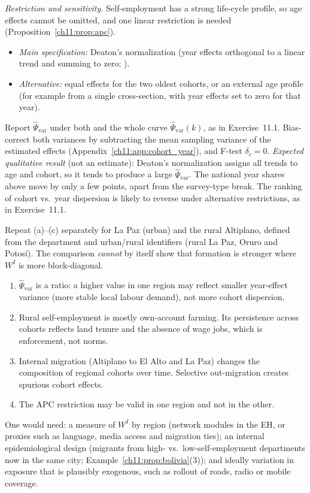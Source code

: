 \documentclass[../solutions_manual.tex]{subfiles}
\begin{document}
 \emph{Restriction and sensitivity.} Self-employment has a strong life-cycle profile, so age effects cannot be omitted, and one linear restriction is needed (Proposition~\ref{ch11:prop:apc}).
\begin{itemize}
\item \emph{Main specification:} Deaton's normalization (year effects orthogonal to a linear trend and summing to zero; \citealt[\S2.7]{deaton1997analysis}).
\item \emph{Alternative:} equal effects for the two oldest cohorts, or an external age profile (for example from a single cross-section, with year effects set to zero for that year).
\end{itemize}
Report $\hat\Psi_{\text{var}}$ under both and the whole curve $\hat\Psi_{\text{var}}(k)$, as in Exercise~11.1. Bias-correct both variances by subtracting the mean sampling variance of the estimated effects (Appendix~\ref{ch11:app:cohort_year}), and F-test $\delta_c = 0$. \emph{Expected qualitative result} (not an estimate): Deaton's normalization assigns all trends to age and cohort, so it tends to produce a large $\hat\Psi_{\text{var}}$. The national year shares above move by only a few points, apart from the survey-type break. The ranking of cohort vs.\ year dispersion is likely to reverse under alternative restrictions, as in Exercise~11.1.

 Repeat (a)--(c) separately for La Paz (urban) and the rural Altiplano, defined from the department and urban/rural identifiers (rural La Paz, Oruro and Potosí). The comparison \emph{cannot} by itself show that formation is stronger where $W^I$ is more block-diagonal.
\begin{enumerate}
\item $\hat\Psi_{\text{var}}$ is a ratio: a higher value in one region may reflect smaller year-effect variance (more stable local labour demand), not more cohort dispersion.
\item Rural self-employment is mostly own-account farming. Its persistence across cohorts reflects land tenure and the absence of wage jobs, which is enforcement, not norms.
\item Internal migration (Altiplano to El Alto and La Paz) changes the composition of regional cohorts over time. Selective out-migration creates spurious cohort effects.
\item The APC restriction may be valid in one region and not in the other.
\end{enumerate}
One would need: a measure of $W^I$ by region (network modules in the EH, or proxies such as language, media access and migration ties); an internal epidemiological design (migrants from high- vs.\ low-self-employment departments now in the same city; Example~\ref{ch11:prop:bolivia}(3)); and ideally variation in exposure that is plausibly exogenous, such as rollout of roads, radio or mobile coverage.
\end{document}
